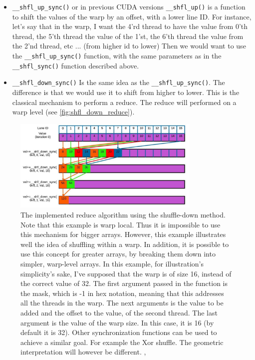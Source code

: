\begin{itemize}
    \item \verb|__shfl_up_sync()| or in previous CUDA versions \verb|__shfl_up()| is a function to 
        shift the values of the warp by an offset, with a lower line ID. For instance, let's say that in the warp, I want 
        the 4'rd thread to have the value from 0'th thread, the 5'th thread the value of the 1'st, the 6'th 
        thread the value from the 2'nd thread, etc ... (from higher id to lower) Then we would want to use the \verb|__shfl_up_sync()| 
        function, with the same parameters as in the \verb|__shfl_sync()| function described above.
    \item \verb|__shfl_down_sync()| Is the same idea as the \verb|__shfl_up_sync()|. The difference is that 
        we would use it to shift from higher to lower. This is the classical mechanism to perform a reduce. The reduce will performed 
        on a warp level (see \autoref{fig:shfl_down_reduce}). 
\end{itemize}

\begin{figure}
  \centering
  \includegraphics[width=0.8\textwidth]{pngs/shfl_down_reduce.jpg}
  \caption{The implemented reduce algorithm using the shuffle-down method. 
  Note that this example is warp local. Thus it is impossible to use this mechanism for bigger arrays. 
  However, this example illustrates well the idea of shuffling within a warp. In addition, it is possible 
to use this concept for greater arrays, by breaking them down into simpler, warp-level arrays. 
In this example, for illustration's simplicity's sake, 
I've supposed that the warp is of size 16, instead of the correct value of 32. The first argument passed in the 
function is the mask, which is -1 in hex notation, meaning that this addresses all the threads in the warp. The next arguments 
is the value to be added and the offset to the value, of the second thread. The last argument is the value of the warp size. In this case, 
it is 16 (by default it is 32). Other synchronization functions can be used to achieve a similar goal. For example the Xor shuffle. 
The geometric interpretation will however be different. \cite{giles_warp_nodate}, \cite{armour_warp_nodate}}
  \label{fig:shfl_down_reduce}
\end{figure}

